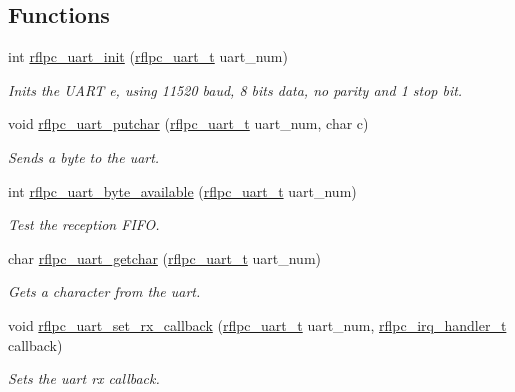 \subsection*{Functions}
\begin{DoxyCompactItemize}
\item 
int \hyperlink{group__uart_ga1e5fb400995bca1ce174ee38f0b538b1}{rflpc\-\_\-uart\-\_\-init} (\hyperlink{group__uart_gab5996edf55ac7654ec4040e6aedaa7ca}{rflpc\-\_\-uart\-\_\-t} uart\-\_\-num)
\begin{DoxyCompactList}\small\item\em Inits the U\-A\-R\-T e, using 11520 baud, 8 bits data, no parity and 1 stop bit. \end{DoxyCompactList}\item 
void \hyperlink{group__uart_gad350726760ac1e9064a0e90e99bef65f}{rflpc\-\_\-uart\-\_\-putchar} (\hyperlink{group__uart_gab5996edf55ac7654ec4040e6aedaa7ca}{rflpc\-\_\-uart\-\_\-t} uart\-\_\-num, char c)
\begin{DoxyCompactList}\small\item\em Sends a byte to the uart. \end{DoxyCompactList}\item 
int \hyperlink{group__uart_gafd482b513bca251e0226cc22a202c808}{rflpc\-\_\-uart\-\_\-byte\-\_\-available} (\hyperlink{group__uart_gab5996edf55ac7654ec4040e6aedaa7ca}{rflpc\-\_\-uart\-\_\-t} uart\-\_\-num)
\begin{DoxyCompactList}\small\item\em Test the reception F\-I\-F\-O. \end{DoxyCompactList}\item 
char \hyperlink{group__uart_ga7a84e7eb041ac05833c8b4d87fbf6f3e}{rflpc\-\_\-uart\-\_\-getchar} (\hyperlink{group__uart_gab5996edf55ac7654ec4040e6aedaa7ca}{rflpc\-\_\-uart\-\_\-t} uart\-\_\-num)
\begin{DoxyCompactList}\small\item\em Gets a character from the uart. \end{DoxyCompactList}\item 
void \hyperlink{group__uart_gaa5113c8db7526435ee9f25726a7bdcaa}{rflpc\-\_\-uart\-\_\-set\-\_\-rx\-\_\-callback} (\hyperlink{group__uart_gab5996edf55ac7654ec4040e6aedaa7ca}{rflpc\-\_\-uart\-\_\-t} uart\-\_\-num, \hyperlink{group__irq_ga4970a8a2cf9b63e4c261982504669a1f}{rflpc\-\_\-irq\-\_\-handler\-\_\-t} callback)
\begin{DoxyCompactList}\small\item\em Sets the uart rx callback. \end{DoxyCompactList}\end{DoxyCompactItemize}


